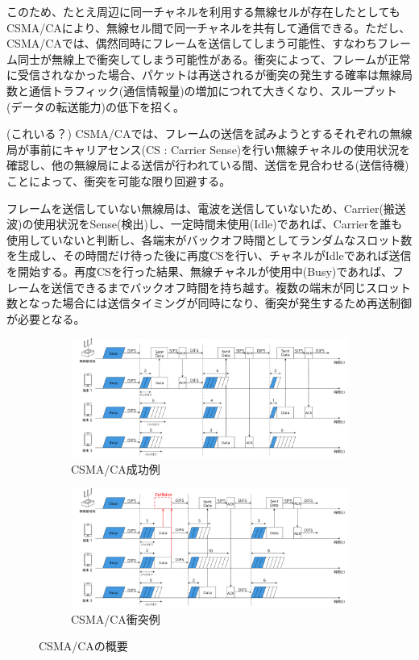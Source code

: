 \documentclass[a4paper,10pt]{ltjsarticle}
\begin{document}
このため、たとえ周辺に同一チャネルを利用する無線セルが存在したとしてもCSMA/CAにより、無線セル間で同一チャネルを共有して通信できる。ただし、CSMA/CAでは、偶然同時にフレームを送信してしまう可能性、すなわちフレーム同士が無線上で衝突してしまう可能性がある。衝突によって、フレームが正常に受信されなかった場合、パケットは再送されるが衝突の発生する確率は無線局数と通信トラフィック(通信情報量)の増加につれて大きくなり、スループット(データの転送能力)の低下を招く。

(これいる？)
CSMA/CAでは、フレームの送信を試みようとするそれぞれの無線局が事前にキャリアセンス(CS : Carrier Sense)を行い無線チャネルの使用状況を確認し、他の無線局による送信が行われている間、送信を見合わせる(送信待機)ことによって、衝突を可能な限り回避する。

フレームを送信していない無線局は、電波を送信していないため、Carrier(搬送波)の使用状況をSense(検出)し、一定時間未使用(Idle)であれば、Carrierを誰も使用していないと判断し、各端末がバックオフ時間としてランダムなスロット数を生成し、その時間だけ待った後に再度CSを行い、チャネルがIdleであれば送信を開始する。再度CSを行った結果、無線チャネルが使用中(Busy)であれば、フレームを送信できるまでバックオフ時間を持ち越す。複数の端末が同じスロット数となった場合には送信タイミングが同時になり、衝突が発生するため再送制御が必要となる。


\begin{figure}[H]
  \centering

  \begin{subfigure}{\textwidth}
    \centering
    \includegraphics[width=1\textwidth]{./assets/csma-ca-s.png}
    \caption{CSMA/CA成功例}
    \label{1a}
  \end{subfigure}


  \begin{subfigure}{\textwidth}
    \centering
    \includegraphics[width=1\textwidth]{./assets/csma-ca-f.png}
    \caption{CSMA/CA衝突例}
    \label{1b}
  \end{subfigure}


  \caption{CSMA/CAの概要}
  \label{CSMA/CA}
\end{figure}
\end{document}
